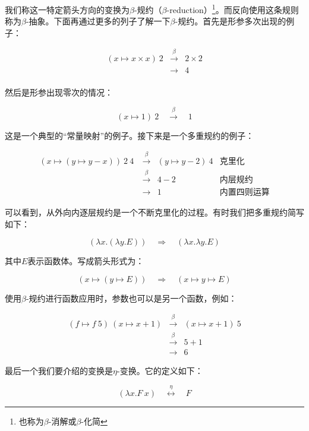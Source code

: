 \documentclass[UTF8]{article}
\begin{document}
我们称这一特定箭头方向的变换为$\beta$-规约（$\beta$-reduction）\footnote{也称为$\beta$-消解或$\beta$-化简}。而反向使用这条规则称为$\beta$-抽象。下面再通过更多的列子了解一下$\beta$-规约。首先是形参多次出现的例子：

\[
\begin{array}{rcl}
(x \mapsto x \times x)\ 2 & \overset{\beta}{\longrightarrow} & 2 \times 2 \\
                          & \longrightarrow & 4 \\
\end{array}
\]

然后是形参出现零次的情况：

\[
(x \mapsto 1)\ 2 \quad \overset{\beta}{\longrightarrow} \quad 1
\]

这是一个典型的“常量映射”的例子。接下来是一个多重规约的例子：

\[
\begin{array}{rcll}
(x \mapsto (y \mapsto y - x))\ 2\ 4\ & \overset{\beta}{\longrightarrow} & (y \mapsto y - 2)\ 4 & \text{克里化} \\
                                     & \overset{\beta}{\longrightarrow} & 4 - 2 & \text{内层规约} \\
                                     & \longrightarrow & 1 & \text{内置四则运算}
\end{array}
\]

可以看到，从外向内逐层规约是一个不断克里化的过程。有时我们把多重规约简写如下：

\[
(\lambda x . (\lambda y . E)) \quad \Rightarrow \quad (\lambda x . \lambda y . E)
\]

其中$E$表示函数体。写成箭头形式为：

\[
(x \mapsto (y \mapsto E)) \quad \Rightarrow \quad (x \mapsto y \mapsto E)
\]

使用$\beta$-规约进行函数应用时，参数也可以是另一个函数，例如：

\[
\begin{array}{rcl}
(f \mapsto f\ 5)\ (x \mapsto x + 1) & \overset{\beta}{\longrightarrow} & (x \mapsto x + 1)\ 5 \\
                                    & \overset{\beta}{\longrightarrow} & 5 + 1 \\
                                    & \longrightarrow & 6
\end{array}
\]

最后一个我们要介绍的变换是$\eta$-变换。它的定义如下：

\[
(\lambda x . F\ x) \quad \overset{\eta}{\longleftrightarrow} \quad F
\]
\end{document}
